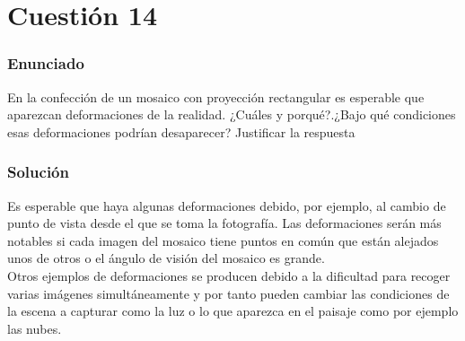 
\section{Cuestión 14}

\subsubsection{Enunciado}

En la confección de un mosaico con proyección rectangular es esperable que aparezcan deformaciones de la realidad. ¿Cuáles y porqué?.¿Bajo qué condiciones esas deformaciones podrían desaparecer? Justificar la respuesta 

\subsubsection{Solución}

Es esperable que haya algunas deformaciones debido, por ejemplo, al cambio de punto de vista desde el que se toma la fotografía. Las deformaciones serán más notables si cada imagen del mosaico tiene puntos en común que están alejados unos de otros o el ángulo de visión del mosaico es grande.\\
Otros ejemplos de deformaciones se producen debido a la dificultad para recoger varias imágenes simultáneamente y por tanto pueden cambiar las condiciones de la escena a capturar como la luz o lo que aparezca en el paisaje como por ejemplo las nubes.


